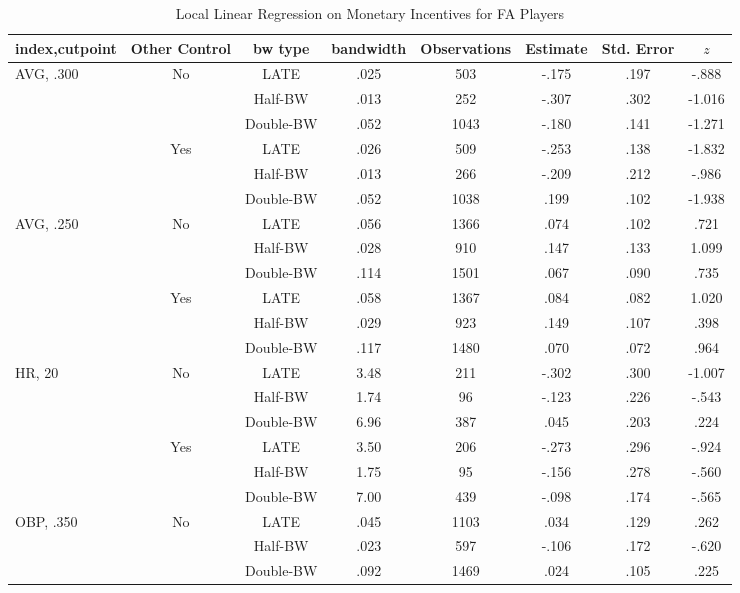 \documentclass[dvipdfmx, 12pt]{article}
\begin{document}
\begin{table}[H]
  \caption{Local Linear Regression on Monetary Incentives for FA Players}
  \label{RDD_B}
  \fontsize{9pt}{6pt}\selectfont
  \centering
  \begin{tabular}{@{\extracolsep{0pt}}lccccccc}\hline
    index,cutpoint & Other Control & bw type & bandwidth
    & Observations & Estimate & Std. Error & $z$
    \\ \hline \hline
    AVG, .300 & No &LATE & .025 & 503 & -.175 & .197 & -.888 \\
    & &Half-BW &  .013 & 252 & -.307 & .302 & -1.016 \\
    & & Double-BW & .052 & 1043  & -.180 & .141 & -1.271 \\ \cline{3-8}

    & Yes &LATE & .026 & 509 & -.253 & .138 & -1.832 \\
    & &Half-BW &  .013 & 266 & -.209 & .212 & -.986 \\
    & & Double-BW & .052 & 1038  & .199 & .102 & -1.938 \\ \hline

    AVG, .250 & No &LATE & .056 & 1366 & .074 & .102 & .721 \\
    & &Half-BW & .028 & 910 & .147 & .133 & 1.099 \\
    & & Double-BW & .114 & 1501  & .067 & .090 & .735 \\ \cline{3-8}

    & Yes &LATE & .058 & 1367 & .084 & .082 & 1.020 \\
    & &Half-BW & .029 & 923 & .149 & .107 & .398 \\
    & & Double-BW & .117 & 1480  & .070 & .072 & .964 \\ \hline

    HR, 20 & No & LATE & 3.48 & 211 & -.302 & .300 & -1.007 \\
    & & Half-BW & 1.74 & 96 & -.123 & .226 & -.543 \\
    & & Double-BW & 6.96 & 387 & .045 & .203 & .224 \\ \cline{3-8}

    & Yes & LATE & 3.50  & 206 & -.273 & .296 & -.924\\
    & & Half-BW & 1.75 & 95 & -.156 & .278 & -.560 \\
    & & Double-BW & 7.00 & 439 & -.098 & .174 & -.565 \\ \hline

    OBP, .350 & No &LATE & .045 & 1103 & .034 & .129 & .262 \\
    & & Half-BW & .023 & 597 & -.106 & .172 & -.620 \\
    & & Double-BW & .092 & 1469 & .024 & .105 & .225 \\ \cline{3-8}


\end{tabular}
\end{table}
\end{document}
